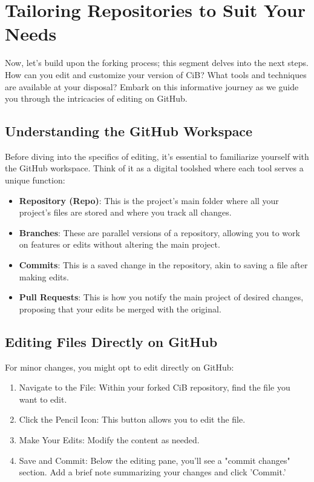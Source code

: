 \documentclass[a4paper,12pt]{book}
\begin{document}
\section*{Tailoring Repositories to Suit Your Needs}
Now, let's build upon the forking process; this segment delves into the next steps. How can you edit and customize your version of CiB? What tools and techniques are available at your disposal? Embark on this informative journey as we guide you through the intricacies of editing on GitHub.

\subsection*{Understanding the GitHub Workspace}
Before diving into the specifics of editing, it's essential to familiarize yourself with the GitHub workspace. Think of it as a digital toolshed where each tool serves a unique function:

\begin{itemize}
    \item \textbf{Repository (Repo)}: This is the project's main folder where all your project's files are stored and where you track all changes.
    \item \textbf{Branches}: These are parallel versions of a repository, allowing you to work on features or edits without altering the main project.
    \item \textbf{Commits}: This is a saved change in the repository, akin to saving a file after making edits.
    \item \textbf{Pull Requests}: This is how you notify the main project of desired changes, proposing that your edits be merged with the original.
\end{itemize}

\subsection*{Editing Files Directly on GitHub}
For minor changes, you might opt to edit directly on GitHub:

\begin{enumerate}
    \item Navigate to the File: Within your forked CiB repository, find the file you want to edit.
    \item Click the Pencil Icon: This button allows you to edit the file.
    \item Make Your Edits: Modify the content as needed.
    \item Save and Commit: Below the editing pane, you'll see a "commit changes" section. Add a brief note summarizing your changes and click 'Commit.'
\end{enumerate}
\end{document}

